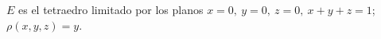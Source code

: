 \item $E$ es el tetraedro limitado por los planos $x = 0, \ y = 0, \ z = 0, \ x + y + z = 1$; $\rho(x, y, z) = y$.

